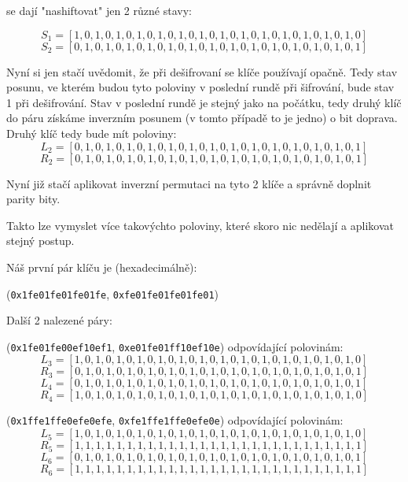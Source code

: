 \documentclass[12pt, a4paper]{article}
\begin{document}
se dají "nashiftovat" jen 2 různé stavy:

$$S_1 =[1, 0, 1, 0, 1, 0, 1, 0, 1, 0, 1, 0, 1, 0, 1, 0, 1, 0, 1, 0, 1, 0, 1, 0, 1, 0, 1, 0]$$
$$S_2 =[0, 1, 0, 1, 0, 1, 0, 1, 0, 1, 0, 1, 0, 1, 0, 1, 0, 1, 0, 1, 0, 1, 0, 1, 0, 1, 0, 1]$$

Nyní si jen stačí uvědomit, že při dešifrovaní se klíče používají opačně. Tedy stav posunu, ve kterém budou tyto poloviny v poslední rundě při šifrování, bude stav 1 při dešifrování. Stav v poslední rundě je stejný jako na počátku, tedy druhý klíč do páru získáme inverzním posunem (v tomto případě to je jedno) o bit doprava. Druhý klíč tedy bude mít poloviny:
$$L_2 =[0, 1, 0, 1, 0, 1, 0, 1, 0, 1, 0, 1, 0, 1, 0, 1, 0, 1, 0, 1, 0, 1, 0, 1, 0, 1, 0, 1]$$
$$R_2 =[0, 1, 0, 1, 0, 1, 0, 1, 0, 1, 0, 1, 0, 1, 0, 1, 0, 1, 0, 1, 0, 1, 0, 1, 0, 1, 0, 1]$$

Nyní již stačí aplikovat inverzní permutaci na tyto 2 klíče a správně doplnit parity bity.

Takto lze vymyslet více takovýchto poloviny, které skoro nic nedělají a aplikovat stejný postup.

Náš první pár klíču je (hexadecimálně): 

(\texttt{0x1fe01fe01fe01fe}, \texttt{0xfe01fe01fe01fe01})

Další 2 nalezené páry:

(\texttt{0x1fe01fe00ef10ef1}, \texttt{0xe01fe01ff10ef10e}) odpovídající polovinám:
$$L_3 = [1, 0, 1, 0, 1, 0, 1, 0, 1, 0, 1, 0, 1, 0, 1, 0, 1, 0, 1, 0, 1, 0, 1, 0, 1, 0, 1, 0]$$
$$R_3 = [0, 1, 0, 1, 0, 1, 0, 1, 0, 1, 0, 1, 0, 1, 0, 1, 0, 1, 0, 1, 0, 1, 0, 1, 0, 1, 0, 1]$$
$$L_4 = [0, 1, 0, 1, 0, 1, 0, 1, 0, 1, 0, 1, 0, 1, 0, 1, 0, 1, 0, 1, 0, 1, 0, 1, 0, 1, 0, 1]$$
$$R_4 = [1, 0, 1, 0, 1, 0, 1, 0, 1, 0, 1, 0, 1, 0, 1, 0, 1, 0, 1, 0, 1, 0, 1, 0, 1, 0, 1, 0]$$

(\texttt{0x1ffe1ffe0efe0efe}, \texttt{0xfe1ffe1ffe0efe0e}) odpovídající polovinám:
$$L_5 = [1, 0, 1, 0, 1, 0, 1, 0, 1, 0, 1, 0, 1, 0, 1, 0, 1, 0, 1, 0, 1, 0, 1, 0, 1, 0, 1, 0]$$
$$R_5 = [1, 1, 1, 1, 1, 1, 1, 1, 1, 1, 1, 1, 1, 1, 1, 1, 1, 1, 1, 1, 1, 1, 1, 1, 1, 1, 1, 1]$$
$$L_6 = [0, 1, 0, 1, 0, 1, 0, 1, 0, 1, 0, 1, 0, 1, 0, 1, 0, 1, 0, 1, 0, 1, 0, 1, 0, 1, 0, 1]$$
$$R_6 = [1, 1, 1, 1, 1, 1, 1, 1, 1, 1, 1, 1, 1, 1, 1, 1, 1, 1, 1, 1, 1, 1, 1, 1, 1, 1, 1, 1]$$
\end{document}
